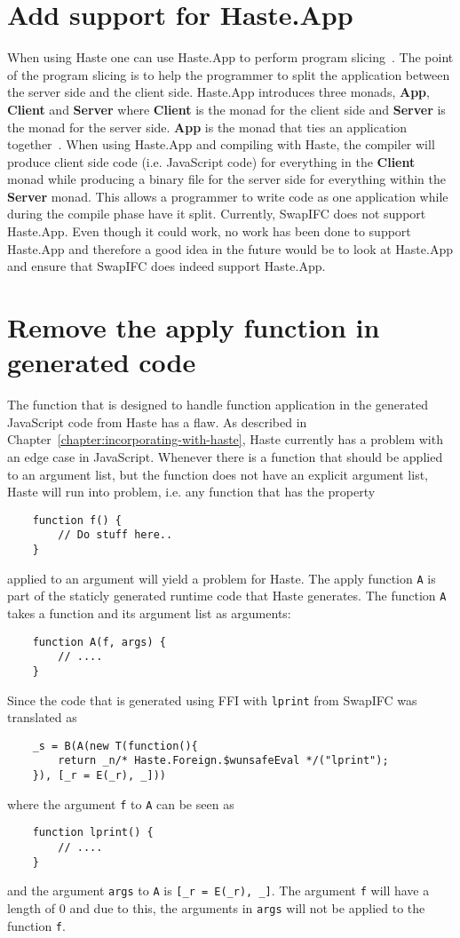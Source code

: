 \section{Add support for Haste.App}
\label{chapter:future-haste-app}
When using Haste one can use Haste.App to perform program slicing~\cite{haste-symposium}. The point of the program slicing is to help the programmer to split the application between the server side and the client side. Haste.App introduces three monads, \textbf{App}, \textbf{Client} and \textbf{Server} where \textbf{Client} is the monad for the client side and \textbf{Server} is the monad for the server side. \textbf{App} is the monad that ties an application together~\cite{haste-app}. When using Haste.App and compiling with Haste, the compiler will produce client side code (i.e. JavaScript code) for everything in the \textbf{Client} monad while producing a binary file for the server side for everything within the \textbf{Server} monad. This allows a programmer to write code as one application while during the compile phase have it split. Currently, SwapIFC does not support Haste.App. Even though it could work, no work has been done to support Haste.App and therefore a good idea in the future would be to look at Haste.App and ensure that SwapIFC does indeed support Haste.App.

\section{Remove the apply function in generated code}
The function that is designed to handle function application in the generated JavaScript code from Haste has a flaw. As described in Chapter~\ref{chapter:incorporating-with-haste}, Haste currently has a problem with an edge case in JavaScript. Whenever there is a function that should be applied to an argument list, but the function does not have an explicit argument list, Haste will run into problem, i.e. any function that has the property
\begin{verbatim}
    function f() {
        // Do stuff here..
    }
\end{verbatim}
applied to an argument will yield a problem for Haste. The apply function {\tt A} is part of the staticly generated runtime code that Haste generates. The function {\tt A} takes a function and its argument list as arguments:
\begin{verbatim}
    function A(f, args) {
        // ....
    }
\end{verbatim}
Since the code that is generated using FFI with {\tt lprint} from SwapIFC  was translated as
\begin{verbatim}
    _s = B(A(new T(function(){
        return _n/* Haste.Foreign.$wunsafeEval */("lprint");
    }), [_r = E(_r), _]))
\end{verbatim}
where the argument {\tt f} to {\tt A} can be seen as
\begin{verbatim}
    function lprint() {
        // ....
    }
\end{verbatim}
and the argument {\tt args} to {\tt A} is {\tt [\_r = E(\_r), \_]}. The argument {\tt f} will have a length of 0 and due to this, the arguments in {\tt args} will not be applied to the function {\tt f}.

